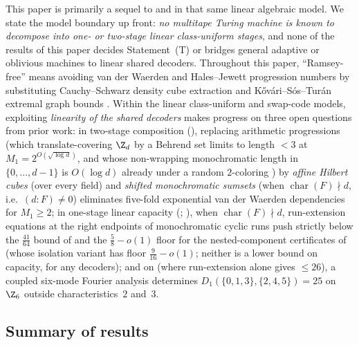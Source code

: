 This paper is primarily a sequel to \cite{SharedDecoders2026} and \cite{SeventeenthPaper2026} in
that same linear algebraic model. We state the model boundary up front: \emph{no multitape Turing
machine is known to decompose into one- or two-stage linear class-uniform stages}, and none of the
results of this paper decides Statement~(T) or bridges general adaptive or oblivious machines to
linear shared decoders. Throughout this paper, ``Ramsey-free'' means avoiding van der Waerden and
Hales--Jewett progression numbers by substituting Cauchy--Schwarz density cube extraction
\cite{Szemeredi1969,GRS1990} and K\H{o}v\'ari--S\'os--Tur\'an extremal graph bounds
\cite{KovariSosTuran1954}. Within the linear class-uniform and swap-code models, exploiting
\emph{linearity of the shared decoders} makes progress on three open questions from prior work: in
two-stage composition (\cite[Section~8]{SharedDecoders2026}), replacing arithmetic progressions (which
translate-covering $\Z_d$ by a Behrend set \cite{Behrend1946} limits to length $< 3$ at
$M_1 = 2^{O(\sqrt{\log d})}$, and whose non-wrapping monochromatic length in $\{0, \dots, d-1\}$ is
$O(\log d)$ already under a random $2$-coloring \cite{GRS1990,AlonSpencer2016}) by \emph{affine Hilbert
cubes} (over every field) and \emph{shifted monochromatic sumsets} (when $\operatorname{char}(F) \nmid d$,
i.e.\ $(d : F) \ne 0$) eliminates five-fold exponential van der Waerden dependencies \cite{Gowers2001} for
$M_1 \ge 2$; in one-stage linear capacity (\cite[Problem~9.1(a)]{SeventeenthPaper2026};
\cite[Section~3 and Appendix~C]{SharedDecoders2026}), when $\operatorname{char}(F) \nmid d$,
run-extension equations at the right endpoints of monochromatic cyclic runs push strictly below the
$\frac{41}{64}$ bound of \cite[Theorem~3.4]{SharedDecoders2026} and the $\frac{5}{8} - o(1)$ floor
for the nested-component certificates of \cite[Theorem~C.6]{SharedDecoders2026} (whose isolation
variant \cite[Theorem~C.7]{SharedDecoders2026} has floor $\frac{9}{16} - o(1)$; neither is a lower
bound on capacity, for any decoders); and on \cite[Problem~9.1(b)]{SeventeenthPaper2026} (where run-extension alone gives
$\le 26$), a coupled six-mode Fourier analysis determines $D_1(\{0,1,3\},\{2,4,5\}) = 25$ on $\Z_6$
outside characteristics~$2$ and~$3$.

\subsection{Summary of results}\label{sec:results-overview}

